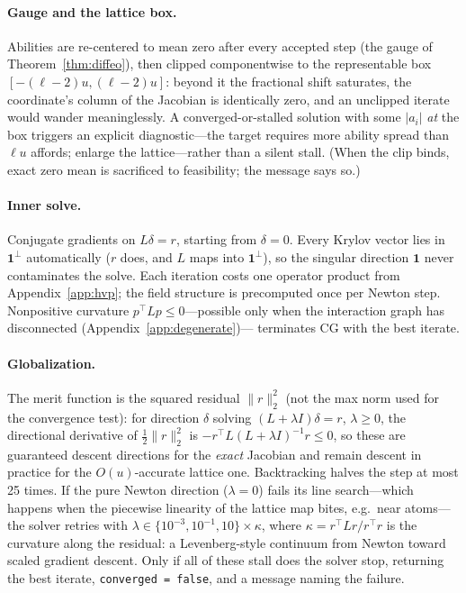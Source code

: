 \documentclass[11pt]{article}
\theoremstyle{definition}
\theoremstyle{remark}
\newcommand{\one}{\mathbf{1}}
\newcommand{\perpone}{\one^{\perp}}
\begin{document}
\paragraph{Gauge and the lattice box.}
Abilities are re-centered to mean zero after every accepted step (the gauge
of Theorem~\ref{thm:diffeo}), then clipped componentwise to the
representable box $[-(\ell-2)u, (\ell-2)u]$: beyond it the fractional shift
saturates, the coordinate's column of the Jacobian is identically zero, and
an unclipped iterate would wander meaninglessly.  A converged-or-stalled
solution with some $|a_i|$ \emph{at} the box triggers an explicit
diagnostic---the target requires more ability spread than $\ell u$
affords; enlarge the lattice---rather than a silent stall.  (When the clip
binds, exact zero mean is sacrificed to feasibility; the message says so.)

\paragraph{Inner solve.}
Conjugate gradients on $L\delta = r$, starting from $\delta = 0$.  Every
Krylov vector lies in $\perpone$ automatically ($r$ does, and $L$ maps into
$\perpone$), so the singular direction $\one$ never contaminates the solve.
Each iteration costs one operator product from
Appendix~\ref{app:hvp}; the field structure is precomputed once per Newton
step.  Nonpositive curvature $p^\top L p \le 0$---possible only when the
interaction graph has disconnected (Appendix~\ref{app:degenerate})---
terminates CG with the best iterate.

\paragraph{Globalization.}
The merit function is the squared residual $\|r\|_2^2$ (not the max norm
used for the convergence test): for direction $\delta$ solving
$(L + \lambda I)\delta = r$, $\lambda \ge 0$, the directional derivative of
$\tfrac12\|r\|_2^2$ is $-r^\top L(L+\lambda I)^{-1} r \le 0$, so these are
guaranteed descent directions for the \emph{exact} Jacobian and remain
descent in practice for the $O(u)$-accurate lattice one.  Backtracking
halves the step at most 25 times.  If the pure Newton direction
($\lambda = 0$) fails its line search---which happens when the piecewise
linearity of the lattice map bites, e.g.\ near atoms---the solver retries
with $\lambda \in \{10^{-3}, 10^{-1}, 10\} \times \kappa$, where
$\kappa = r^\top L r / r^\top r$ is the curvature along the residual: a
Levenberg-style continuum from Newton toward scaled gradient descent.  Only
if all of these stall does the solver stop, returning the best iterate,
\texttt{converged = false}, and a message naming the failure.
\end{document}
